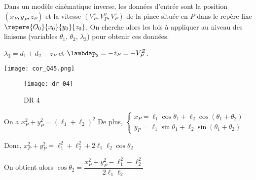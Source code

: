  Dans un modèle cinématique inverse, les données d'entrée sont la position $\left(x_P, y_P, z_P\right)$ et la
 vitesse $\left(V_P^x,V_P^y,V_P^z\right)$ de la pince située en $P$ dans le repère fixe $\repere{O_0}{x_0}{y_0}{z_0}$. On cherche  alors les lois à appliquer au niveau des liaisons (variables $\theta_1$, $\theta_2$, $\lambda_3$) pour obtenir ces données.

 \ifprof
 \begin{corrige}
 $\lambda_3 = d_1 + d_2 -z_P$ et  $\lambdap_3 = -\dot{z}_P = -V_P^Z$.
 \end{corrige}
 \else
 \fi
 
 \ifprof
 \begin{corrige}
 \begin{center}
 \texttt{[image: cor\_Q45.png]}
\end{center}

 
 \end{corrige}
 \else
 \fi
 
 \ifprof
\else
\begin{figure}[!h]
\centering
\texttt{[image: dr\_04]}
\caption{DR 4 \label{xens_2027_dr03}}
\end{figure}
\fi

  \ifprof
 \begin{corrige}
On a $x_P^2+y_P^2=(\ell_1+\ell_2 )^2$
De plus, 
$\left\{\begin{array}{l}
x_P=\ell_1\cos\theta_1+\ell_2\cos\left(\theta_1+\theta_2\right)\\
y_P=\ell_1\sin\theta_1+\ell_2\sin(\theta_1+\theta_2)
\end{array} \right.$

Donc,					 $x_P^2+y_P^2= \ell_1^2+\ell_2^2+2\ell_1 \ell_2  \cos\theta_2$

On obtient alors $\cos\theta_2= \dfrac{ x_P^2+y_P^2-\ell_1^2-\ell_2^2}{2\ell_1 \ell_2 }$

 \end{corrige}
 \else
 \fi
 
